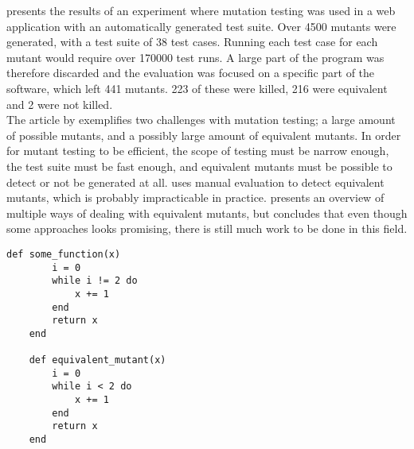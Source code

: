 \citet{article:mutation} presents the results of an experiment where
mutation testing was used in a web application with an automatically
generated test suite. Over 4500 mutants were generated, with a test suite
of 38 test cases. Running each test case for each mutant would require
over 170000 test runs. A large part of the program was therefore
discarded and the evaluation was focused on a specific part of the
software, which left 441 mutants. 223 of these were killed, 216 were
equivalent and 2 were not killed.\\

The article by \citeauthor{article:mutation} exemplifies two challenges
with mutation testing; a large amount of possible mutants, and a
possibly large amount of equivalent mutants. In order for mutant testing
to be efficient, the scope of testing must be narrow enough, the test
suite must be fast enough, and equivalent mutants must be possible to
detect or not be generated at all. \citeauthor{article:mutation} uses
manual evaluation to detect equivalent mutants, which is probably
impracticable in practice. \citet{article:eq_mutant} presents an
overview of multiple ways of dealing with equivalent mutants, but
concludes that even though some approaches looks promising, there is
still much work to be done in this field.\\

\begin{lstlisting}[caption=Example of a program with an equivalent mutant.,
                   label=lst:mutation_eq, float=t]
    def some_function(x)
        i = 0
        while i != 2 do
            x += 1
        end
        return x
    end

    def equivalent_mutant(x)
        i = 0
        while i < 2 do
            x += 1
        end
        return x
    end
\end{lstlisting}

